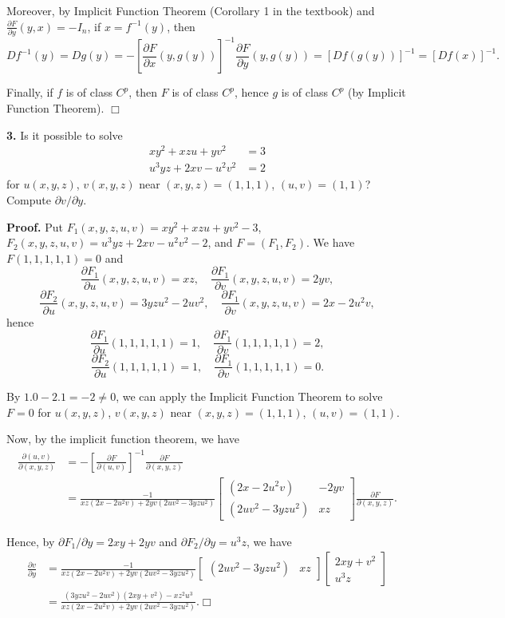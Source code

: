 \documentclass{article}
\begin{document}
Moreover, by Implicit Function Theorem (Corollary 1 in the textbook) and
$\frac{\partial F}{\partial y}(y,x) = -I_n$, if $x=f^{-1}(y)$, then
\[Df^{-1}(y) = Dg(y) = -\left[\frac{\partial F}{\partial x}(y,g(y))\right]^{-1} \frac{\partial F}{\partial y}(y,g(y)) = [Df(g(y))]^{-1} = [Df(x)]^{-1}.\]

Finally, if $f$ is of class $C^{p}$, then $F$ is of class $C^p$, hence
$g$ is of class $C^{p}$ (by Implicit Function Theorem). $\Box$

    \textbf{3.} Is it possible to solve \[\begin{aligned}
xy^2 + xzu + yv^2 &= 3 \\
u^3yz + 2xv − u^2 v^2 &= 2
\end{aligned}\] for $u(x,y,z)$, $v(x,y,z)$ near $(x,y,z) = (1,1,1)$,
$(u,v) = (1,1)$? Compute $\partial v/\partial y$.

    \textbf{Proof.} Put $F_1(x,y,z,u,v) = xy^2 + xzu + yv^2 - 3$,
$F_2(x,y,z,u,v) = u^3yz +2xv - u^2v^2 - 2$, and $F = (F_1, F_2)$. We
have $F(1,1,1,1,1) = 0$ and
\[\frac{\partial F_1}{\partial u}(x,y,z,u,v) = xz, \quad \frac{\partial F_1}{\partial v}(x,y,z,u,v) = 2yv,\]
\[\frac{\partial F_2}{\partial u}(x,y,z,u,v) = 3yzu^2 - 2uv^2, \quad \frac{\partial F_1}{\partial v}(x,y,z,u,v) = 2x - 2u^2v,\]
hence
\[\frac{\partial F_1}{\partial u}(1,1,1,1,1) = 1, \quad \frac{\partial F_1}{\partial v}(1,1,1,1,1) = 2,\]
\[\frac{\partial F_2}{\partial u}(1,1,1,1,1) = 1, \quad \frac{\partial F_1}{\partial v}(1,1,1,1,1) = 0.\]

By $1.0 - 2.1 = -2 \ne 0$, we can apply the Implicit Function Theorem to
solve $F = 0$ for $u(x,y,z)$, $v(x,y,z)$ near $(x,y,z) = (1,1,1)$,
$(u,v) = (1,1)$.

Now, by the implicit function theorem, we have \[
\begin{aligned}
\frac{\partial (u, v)}{\partial (x,y,z)} &= -\left[\frac{\partial F}{\partial (u, v)}\right]^{-1}\frac{\partial F}{\partial (x,y,z)}\\
&= \frac{-1}{xz(2x - 2u^2v) + 2yv(2uv^2 - 3yzu^2)}
\begin{bmatrix}
(2x - 2u^2v) & -2yv \\
(2uv^2-3yzu^2) & xz
\end{bmatrix}\frac{\partial F}{\partial (x,y,z)}.
\end{aligned}\]

Hence, by $\partial F_1/\partial y = 2xy + 2yv$ and
$\partial F_2/\partial y = u^3z$, we have \[
 \begin{aligned}
\frac{\partial v}{\partial y} &= \frac{-1}{xz(2x - 2u^2v) + 2yv(2uv^2 - 3yzu^2)}
\begin{bmatrix}
(2uv^2-3yzu^2) & xz
\end{bmatrix}
\begin{bmatrix}
2xy + v^2 \\
u^3z
\end{bmatrix}\\
&= \frac{(3yzu^2 - 2uv^2)(2xy + v^2) - xz^2u^3}{xz(2x - 2u^2v) + 2yv(2uv^2 - 3yzu^2)}. \Box
\end{aligned}\]
\end{document}
